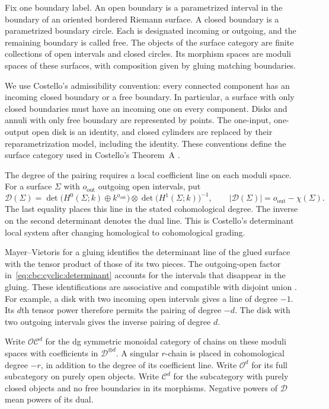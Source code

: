 Fix one boundary label.
An open boundary is a parametrized interval in the boundary of an oriented bordered Riemann surface.
A closed boundary is a parametrized boundary circle.
Each is designated incoming or outgoing, and the remaining boundary is called free.
The objects of the surface category are finite collections of open intervals and closed circles.
Its morphism spaces are moduli spaces of these surfaces, with composition given by gluing matching boundaries.

We use Costello's admissibility convention: every connected component has an incoming closed boundary or a free boundary.
In particular, a surface with only closed boundaries must have an incoming one on every component.
Disks and annuli with only free boundary are represented by points.
The one-input, one-output open disk is an identity, and closed cylinders are replaced by their reparametrization model, including the identity.
These conventions define the surface category used in Costello's Theorem~A \cite[\S3]{CostelloCY}.

The degree of the pairing requires a local coefficient line on each moduli space.
For a surface $\Sigma$ with $o_{\mathrm{out}}$ outgoing open intervals, put
\begin{equation}\label{eq:cbc:cyclic:determinant}
 \mathcal D(\Sigma)
 =\det\bigl(H^0(\Sigma;k)\oplus k^{o_{\mathrm{out}}}\bigr)
       \otimes\det\bigl(H^1(\Sigma;k)\bigr)^{-1},
 \qquad |\mathcal D(\Sigma)|=o_{\mathrm{out}}-\chi(\Sigma).
\end{equation}
The last equality places this line in the stated cohomological degree.
The inverse on the second determinant denotes the dual line.
This is Costello's determinant local system after changing homological to cohomological grading.

Mayer--Vietoris for a gluing identifies the determinant line of the glued surface with the tensor product of those of its two pieces.
The outgoing-open factor in~\eqref{eq:cbc:cyclic:determinant} accounts for the intervals that disappear in the gluing.
These identifications are associative and compatible with disjoint union \cite[\S3, equation defining $\det(\Sigma)$]{CostelloCY}.
For example, a disk with two incoming open intervals gives a line of degree $-1$.
Its $d$th tensor power therefore permits the pairing of degree $-d$.
The disk with two outgoing intervals gives the inverse pairing of degree $d$.

Write $\mathcal{OC}^d$ for the dg symmetric monoidal category of chains on these moduli spaces with coefficients in $\mathcal D^{\otimes d}$.
A singular $r$-chain is placed in cohomological degree $-r$, in addition to the degree of its coefficient line.
Write $\mathcal O^d$ for its full subcategory on purely open objects.
Write $\mathcal C^d$ for the subcategory with purely closed objects and no free boundaries in its morphisms.
Negative powers of $\mathcal D$ mean powers of its dual.

